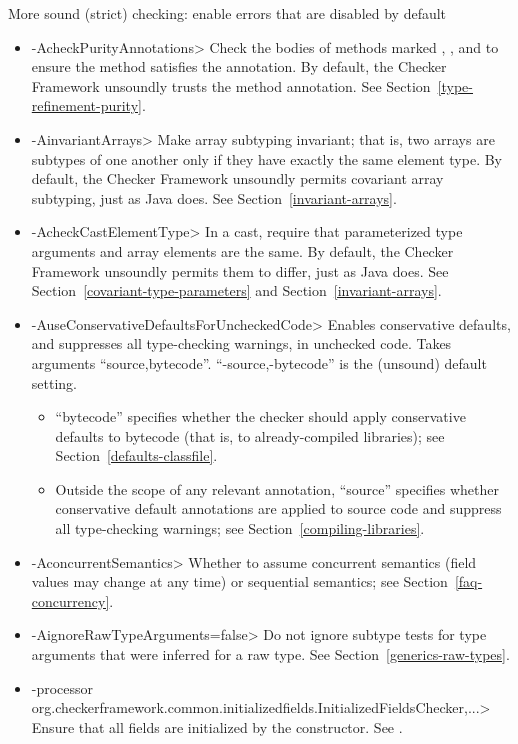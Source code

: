 \label{unsound-by-default}
More sound (strict) checking: enable errors that are disabled by default
\begin{itemize}
\item \<-AcheckPurityAnnotations>
  Check the bodies of methods marked
  ,
  ,
  and 
  to ensure the method satisfies the annotation.  By default,
  the Checker Framework unsoundly trusts the method annotation.  See
  Section~\ref{type-refinement-purity}.
\item \<-AinvariantArrays>
  Make array subtyping invariant; that is, two arrays are subtypes of one
  another only if they have exactly the same element type.  By default,
  the Checker Framework unsoundly permits covariant array subtyping, just
  as Java does.  See Section~\ref{invariant-arrays}.
\item \<-AcheckCastElementType>
  In a cast, require that parameterized type arguments and array elements
  are the same.  By default, the Checker Framework unsoundly permits them
  to differ, just as Java does.  See Section~\ref{covariant-type-parameters}
  and Section~\ref{invariant-arrays}.
\item \<-AuseConservativeDefaultsForUncheckedCode>
  Enables conservative defaults, and suppresses all type-checking warnings,
  in unchecked code.  Takes arguments ``source,bytecode''.
  ``-source,-bytecode'' is the (unsound) default setting.
  \begin{itemize}
  \item
  ``bytecode'' specifies
  whether the checker should apply conservative defaults to
  bytecode (that is, to already-compiled libraries); see
  Section~\ref{defaults-classfile}.
  \item
  Outside the scope of any relevant
   annotation, ``source'' specifies whether conservative
  default annotations are applied to source code and suppress all type-checking warnings; see
  Section~\ref{compiling-libraries}.
  \end{itemize}
\item \<-AconcurrentSemantics>
  Whether to assume concurrent semantics (field values may change at any
  time) or sequential semantics; see Section~\ref{faq-concurrency}.
\item \<-AignoreRawTypeArguments=false>
  Do not ignore subtype tests for type arguments that were inferred for a
  raw type.  See Section~\ref{generics-raw-types}.
\item \<-processor org.checkerframework.common.initializedfields.InitializedFieldsChecker,...>
  Ensure that all fields are initialized by the constructor.  See
  .
\end{itemize}

